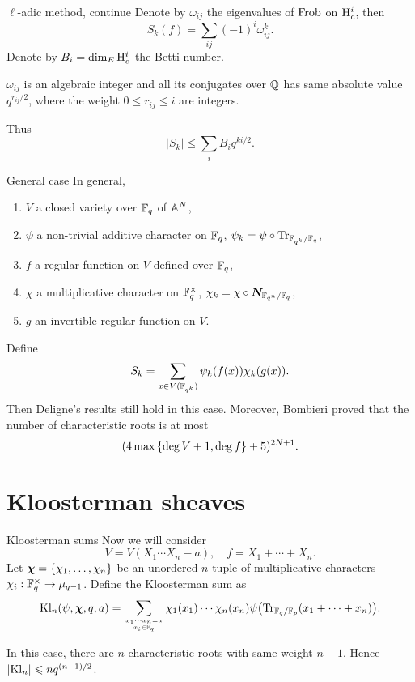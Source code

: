 \documentclass[aspectratio=169,handout]{beamer}
\newcommand\bchi{{\boldsymbol\chi}}
\begin{document}
\begin{frame}{$\ell$-adic method, continue}
Denote by $\omega_{ij}$ the eigenvalues of ${\mathrm{Frob}}$ on ${\mathrm{H}}^i_c$, then
	\[S_k(f)=\sum_{ij}(-1)^i \omega_{ij}^k.\]
Denote by $B_i=\dim_{E}{\mathrm{H}}^i_c$ the Betti number.
\begin{theorem}[Deligne]
$\omega_{ij}$ is an algebraic integer and all its conjugates over ${\mathbb{Q}}$ has same absolute value $q^{r_{ij}/2}$, where the weight $0\le r_{ij}\le i$ are integers.
\end{theorem}
Thus
	\[|S_k|\le \sum_i B_i q^{ki/2}.\]
\end{frame}


\begin{frame}{General case}
In general, 
\begin{enumerate}
\item $V$ a closed variety over ${\mathbb{F}}_q$ of ${\mathbb{A}}^N$,
\item $\psi$ a non-trivial additive character on ${\mathbb{F}}_q$, $\psi_k=\psi\circ {\mathrm{Tr}}_{{\mathbb{F}}_{q^k}/{\mathbb{F}}_q}$,
\item $f$ a regular function on $V$ defined over ${\mathbb{F}}_q$,
\item $\chi$ a multiplicative character on ${\mathbb{F}}_q^\times$, $\chi_k=\chi\circ{\boldsymbol{N}}_{{\mathbb{F}}_{q^n}/{\mathbb{F}}_q}$,
\item $g$ an invertible regular function on $V$.
\end{enumerate} \pause
Define
	\[S_k=\sum_{x\in V({\mathbb{F}}_{q^k})}\psi_k(f(x))\chi_k(g(x)).\]
Then Deligne's results still hold in this case. Moreover, Bombieri proved that the number of  characteristic roots is at most
	\[(4\max{\left\{\deg V+1,\deg f\right\}}+5)^{2N+1}.\]
\end{frame}



\section{Kloosterman sheaves}

\begin{frame}{Kloosterman sums}
Now we will consider
	\[V=V(X_1\cdots X_n-a),\quad f=X_1+\cdots+X_n.\]
Let $\bchi=\set{\chi_1,\dots,\chi_n}$ be an unordered $n$-tuple of multiplicative characters $\chi_i:{\mathbb{F}}_q^\times\to \mu_{q-1}$.
Define the Kloosterman sum as 
	\[\Kl_n(\psi,\bchi,q,a)=\sum_{x_1\cdots x_n=a\atop x_i\in\BF_q}\chi_1(x_1)\cdots\chi_n(x_n)\psi\bigl(\Tr_{\BF_q/\BF_p}(x_1+\cdots+x_n)\bigr).\] \pause

In this case, there are $n$ characteristic roots with same weight $n-1$. Hence $|{\mathrm{Kl}}_n|\leqslant nq^{(n-1)/2}$.
\end{frame}
\end{document}
